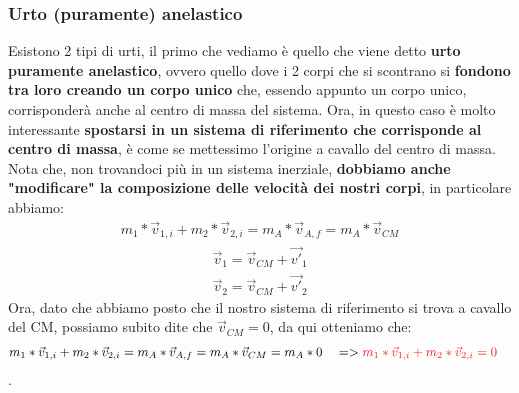         \subsubsection{Urto (puramente) anelastico}
            Esistono 2 tipi di urti, il primo che vediamo è quello che viene detto \textbf{urto puramente anelastico},  ovvero quello dove i 2 corpi che si scontrano si \textbf{fondono tra loro creando un corpo unico} che, essendo appunto un corpo unico, corrisponderà anche al centro di massa del sistema. Ora, in questo caso è molto interessante \textbf{spostarsi in un sistema di riferimento che corrisponde al centro di massa}, è come se mettessimo l'origine a cavallo del centro di massa. Nota che, non trovandoci più in un sistema inerziale, \textbf{dobbiamo anche "modificare" la composizione delle velocità dei nostri corpi}, in particolare abbiamo:
            \begin{align*}
                m_1*\vec{v}_{1,i}+m_2*\vec{v}_{2,i}=m_A*\vec{v}_{A,f}=m_{A}*\vec{v}_{CM}
            \end{align*}
            \begin{align*}
                \vec{v}_1=\vec{v}_{CM}+\vec{v'}_1\\
                \vec{v}_2=\vec{v}_{CM}+\vec{v'}_2
            \end{align*}
            Ora, dato che abbiamo posto che il nostro sistema di riferimento si trova a cavallo del CM, possiamo subito dite che $\vec{v}_{CM} = 0$, da qui otteniamo che:
            \begin{align*}
                &m_1*\vec{v}_{1,i}+m_2*\vec{v}_{2,i}=m_A*\vec{v}_{A,f}=m_{A}*\vec{v}_{CM}=m_{A}*0 &&=>\textcolor{Red}{m_1*\vec{v}_{1,i}+m_2*\vec{v}_{2,i} = 0}
            \end{align*}.

